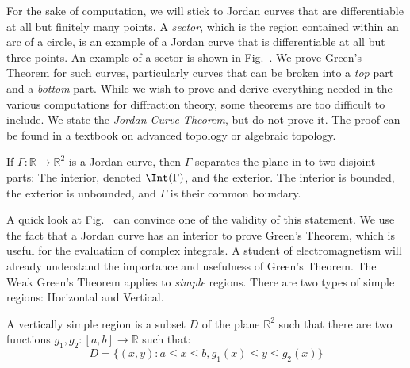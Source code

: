 \documentclass[crop=false,class=book,oneside]{standalone}
\begin{document}
            For the sake of computation, we will stick to
            Jordan curves that are differentiable at all but
            finitely many points. A \textit{sector}, which is
            the region contained within an arc of a circle,
            is an example of a Jordan curve that is differentiable
            at all but three points. An example of a sector is
            shown in Fig.~.
            We prove Green's Theorem
            for such curves, particularly curves that can be
            broken into a \textit{top} part and a
            \textit{bottom} part. While we wish to prove and
            derive everything needed in the various computations
            for diffraction theory, some theorems are too
            difficult to include. We state the \textit{Jordan Curve Theorem},
            but do not prove it. The proof can be found in a
            textbook on advanced topology or algebraic topology.
            \begin{theorem}
                If $\Gamma:\mathbb{R}\rightarrow\mathbb{R}^{2}$
                is a Jordan curve, then $\Gamma$ separates the
                plane in to two disjoint parts:
                The interior, denoted
                $\Int(\Gamma)$, and the exterior. The interior
                is bounded, the exterior is unbounded, and
                $\Gamma$ is their common boundary.
            \end{theorem}
            A quick look at
            Fig.~ can
            convince one of the validity of this statement.
            We use the fact that a Jordan curve has an interior
            to prove Green's Theorem, which is useful for the
            evaluation of complex integrals. A student of
            electromagnetism will already understand the
            importance and usefulness of Green's Theorem.
            The Weak Green's Theorem applies to \textit{simple}
            regions.
            There are two types of simple regions: Horizontal and Vertical.
            \begin{definition}
                A vertically simple region is a subset $D$ of the plane
                $\mathbb{R}^{2}$ such that there are two functions
                $g_{1},g_{2}:[a,b]\rightarrow\mathbb{R}$ such that:
                \begin{equation}
                    D=\{(x,y):a\leq{x}\leq{b},g_{1}(x)\leq{y}\leq{g}_{2}(x)\}
                \end{equation}
            \end{definition}
\end{document}
